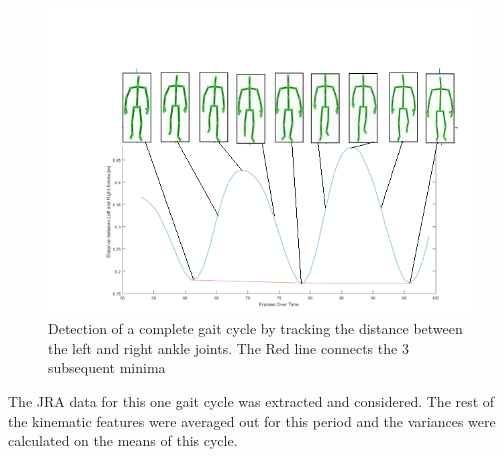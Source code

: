 \begin{figure}[h]
\centering
\includegraphics[scale=0.84]{wave.png}
\caption{Detection of a complete gait cycle by tracking the distance between the left and right ankle joints.
The Red line connects the 3 subsequent minima
}
\end{figure}

\noindent The JRA data for this one gait cycle was extracted and considered. The rest of the kinematic features were averaged out for this period and the variances were calculated on the means of this cycle.\\







